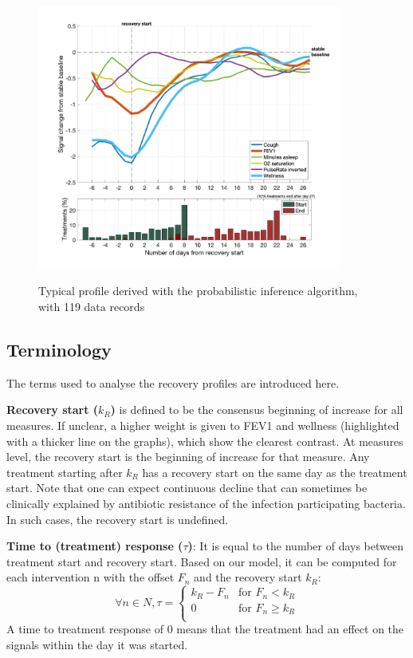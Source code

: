 \begin{figure}[!h]
    \caption{Typical profile derived with the probabilistic inference algorithm, with 119 data records}
    \centering
    \includegraphics[width=100mm]{images/profile_typical.png}
    \label{fig:profile}
\end{figure}

\subsection{Terminology}
The terms used to analyse the recovery profiles are introduced here.

\textbf{Recovery start ($k_R$)} is defined to be the consensus beginning of increase for all measures. If unclear, a higher weight is given to FEV1 and wellness (highlighted with a thicker line on the graphs), which show the clearest contrast. At measures level, the recovery start is the beginning of increase for that measure. Any treatment starting after $k_R$ has a recovery start on the same day as the treatment start. Note that one can expect continuous decline that can sometimes be clinically explained by antibiotic resistance of the infection participating bacteria. In such cases, the recovery start is undefined.

\textbf{Time to (treatment) response ($\tau$)}: It is equal to the number of days between treatment start and recovery start. Based on our model, it can be computed for each intervention n with the offset $F_n$ and the recovery start $k_R$:
\begin{equation}
    \forall n \in N, \tau = 
    \begin{cases}
        k_R - F_n & \text{for } F_n < k_R\\
        0 & \text{for } F_n \geq k_R\\
    \end{cases}
\end{equation}
A time to treatment response of 0 means that the treatment had an effect on the signals within the day it was started.

